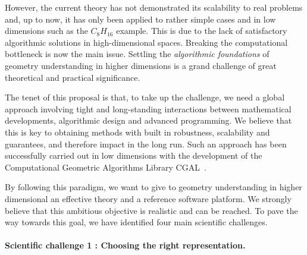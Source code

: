 

However, the current theory has not demonstrated its scalability to real problems and, up to now, it has only been applied to rather simple cases and in low dimensions such as the $C_8H_{16}$ example. This is  due to the lack of satisfactory algorithmic solutions in high-dimensional spaces.
Breaking the computational bottleneck is now the main issue.  Settling the {\em algorithmic foundations} of geometry understanding in
higher dimensions
is a grand challenge of great theoretical and practical significance.


The tenet of this proposal is that, to take up the challenge, we need a global approach involving
tight and long-standing interactions between mathematical developments, algorithmic design and advanced programming. We believe that this is key to obtaining methods with built in
robustness, scalability and guarantees, and therefore  impact in the long run.
Such an approach has been successfully carried out in low dimensions with the 
development of the Computational Geometric Algorithms Library CGAL~\cite{cgal}. 

By following this paradigm, we want  to give to  geometry understanding in higher dimensional an effective theory and a reference software platform. 
We strongly believe that this ambitious objective is realistic and can be reached. To pave the way towards this goal, we have identified  four main scientific challenges.



\paragraph{Scientific challenge 1 :  Choosing the right representation.}

